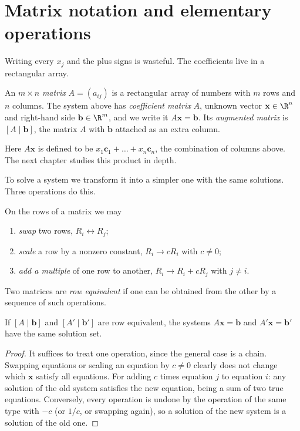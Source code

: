 \section{Matrix notation and elementary operations}

Writing every $x_j$ and the plus signs is wasteful. The coefficients live in a rectangular array.

\begin{definition}
An $m\times n$ \emph{matrix} $A=(a_{ij})$ is a rectangular array of numbers with $m$ rows and $n$ columns. The system above has \emph{coefficient matrix} $A$, unknown vector $\mathbf{x}\in\R^n$ and right-hand side $\mathbf{b}\in\R^m$, and we write it $A\mathbf{x}=\mathbf{b}$. Its \emph{augmented matrix} is $[A\mid\mathbf{b}]$, the matrix $A$ with $\mathbf{b}$ attached as an extra column.
\end{definition}

Here $A\mathbf{x}$ is defined to be $x_1\mathbf{c}_1+\dots+x_n\mathbf{c}_n$, the combination of columns above. The next chapter studies this product in depth.

To solve a system we transform it into a simpler one with the same solutions. Three operations do this.

\begin{definition}
On the rows of a matrix we may
\begin{enumerate}[label=(\roman*)]
  \item \emph{swap} two rows, $R_i\leftrightarrow R_j$;
  \item \emph{scale} a row by a nonzero constant, $R_i\to cR_i$ with $c\ne0$;
  \item \emph{add a multiple} of one row to another, $R_i\to R_i+cR_j$ with $j\ne i$.
\end{enumerate}
Two matrices are \emph{row equivalent} if one can be obtained from the other by a sequence of such operations.
\end{definition}

\begin{theorem}\label{thm:rowops}
If $[A\mid\mathbf{b}]$ and $[A'\mid\mathbf{b}']$ are row equivalent, the systems $A\mathbf{x}=\mathbf{b}$ and $A'\mathbf{x}=\mathbf{b}'$ have the same solution set.
\end{theorem}

\begin{proof}
It suffices to treat one operation, since the general case is a chain. Swapping equations or scaling an equation by $c\ne0$ clearly does not change which $\mathbf{x}$ satisfy all equations. For adding $c$ times equation $j$ to equation $i$: any solution of the old system satisfies the new equation, being a sum of two true equations. Conversely, every operation is undone by the operation of the same type with $-c$ (or $1/c$, or swapping again), so a solution of the new system is a solution of the old one.
\end{proof}


